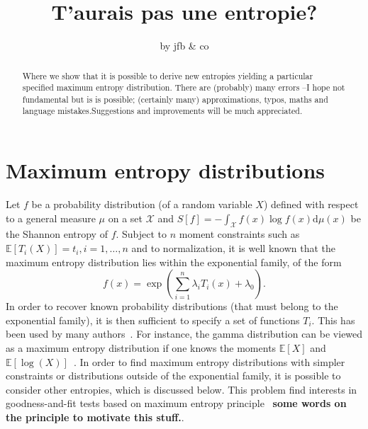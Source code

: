 \documentclass[english,sort&compress]{elsarticle}
\theoremstyle{definition}
\theoremstyle{plain}
\theoremstyle{plain}
\def\dmu{\mathrm{d}\mu}
\def\X{\mathcal{X}}
\newcommand{\Esp}[1]{\mathbb{E}\left[ #1 \right]}
\begin{document}

\title{T'aurais pas une entropie?}
\author{by jfb \& co \date{} }
\begin{abstract}
  Where  we  show  that it  is  possible  to  derive  new entropies  yielding  a
  particular specified  maximum entropy distribution. There  are (probably) many
  errors  --I  hope  not  fundamental  but  is  is  possible;  (certainly  many)
  approximations,   typos,   maths   and   language   mistakes.Suggestions   and
  improvements will be much appreciated.
\end{abstract}

\maketitle



\section{Maximum entropy distributions}
\label{sec:MaxEnt}

Let $f$  be a probability distribution  (of a random variable  $X$) defined with
respect to  a general measure $\mu$  on a set  $\X$ and $\displaystyle S[f]  = -
\int_\X f(x) \log  f(x) \dmu(x)$ be the Shannon entropy of  $f$.  Subject to $n$
moment constraints  such as  $\Esp{T_i(X)} = t_i,  i =  1 , \ldots  , n$  and to
normalization,  it is  well known  that  the maximum  entropy distribution  lies
within the exponential family, of the form
%
\[
f(x) = \exp\left( \sum_{i=1}^n \lambda_i T_i(x) + \lambda_0 \right).
\]
%
In order  to recover  known probability distributions  (that must belong  to the
exponential family), it is then sufficient  to specify a set of functions $T_i$.
This has been used by  many authors~\cite{toto, Kap89, CovTho06}.  For instance,
the gamma  distribution can be viewed  as a maximum entropy  distribution if one
knows the moments $\Esp  X$ and $\Esp{\log(X)}$~\cite{Kap89, CovTho06, ParBer09,
  Gok75, Gok83}.   In order to  find maximum entropy distributions  with simpler
constraints or distributions  outside of the exponential family,  it is possible
to  consider  other entropies,  which  is  discussed  below. This  problem  find
interests    in    goodness-and-fit    tests    based   on    maximum    entropy
principle~\cite{Vas76, Gok83,  Girardin} {\bf\large some words  on the principle
  to motivate this stuff.}.
\end{document}
